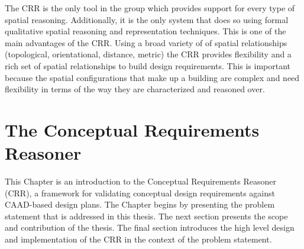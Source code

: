 \documentclass[12pt]{ucthesis}
\begin{document}
\begin{table}[H]
  \begin{center}
  \end{center}
\caption{Related Work Spatial Reasoning}
\label{spatial table}
\end{table}

The CRR is the only tool in the group which provides support for every type of spatial reasoning. Additionally, it is the only system that does so using formal qualitative spatial reasoning and representation techniques. This is one of the main advantages of the CRR. Using a broad variety of of spatial relationships (topological, orientational, distance, metric) the CRR provides flexibility and a rich set of spatial relationships to build design requirements. This is important because the spatial configurations that make up a building are complex and need flexibility in terms of the way they are characterized and reasoned over. 





\chapter{The Conceptual Requirements Reasoner} \label{ccr}
This Chapter is an introduction to the Conceptual Requirements Reasoner (CRR), a framework for validating conceptual design requirements against CAAD-based design plans. The Chapter begins by presenting the problem statement that is addressed in this thesis. The next section presents the scope and contribution of the thesis. The final section introduces the high level design and implementation of the CRR in the context of the problem statement.
 
\end{document}
